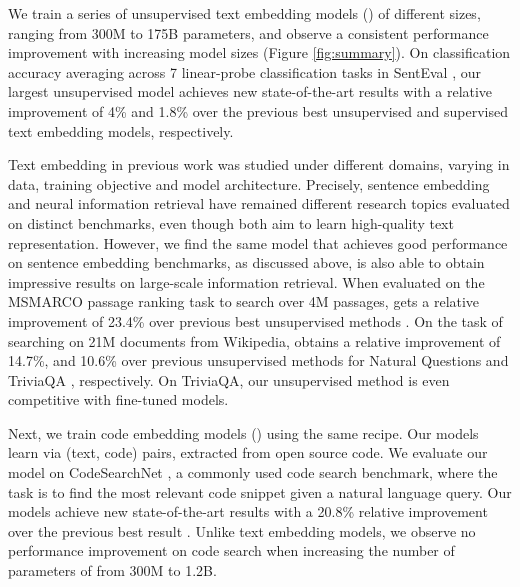 \documentclass[nohyperref]{article}
\begin{document}
We train a series of unsupervised text embedding models () of different sizes, ranging from 300M to 175B parameters, and observe a consistent performance improvement with increasing model sizes (Figure \ref{fig:summary}). On classification accuracy averaging across 7 linear-probe classification tasks in SentEval \cite{senteval}, our largest unsupervised model achieves new state-of-the-art results with a relative improvement of 4\% and 1.8\% over the previous best unsupervised \cite{declutr} and supervised \cite{simcse} text embedding models, respectively.

Text embedding in previous work was studied under different domains, varying in data, training objective and model architecture. Precisely, sentence embedding \cite{sbert,simcse,declutr} and neural information retrieval \cite{ORQA, REALM, dpr, e2e, contreiver} have remained different research topics evaluated on distinct benchmarks, even though both aim to learn high-quality text representation.
However, we find the same model that achieves good performance on sentence embedding benchmarks, as discussed above, is also able to obtain impressive results on large-scale information retrieval. When evaluated on the MSMARCO passage ranking task \cite{msmarco} to search over 4M passages,  gets a relative improvement of 23.4\% over previous best unsupervised methods \cite{bm25}.  On the task of searching on 21M documents from Wikipedia,  obtains a relative improvement of 14.7\%, and 10.6\% over previous unsupervised methods \cite{contreiver} for Natural Questions \cite{nq} and TriviaQA \cite{trivia}, respectively. On TriviaQA, our unsupervised method is even competitive with fine-tuned models. 

Next, we train code embedding models () using the same recipe. Our models learn via (text, code) pairs, extracted from open source code. We evaluate our model on CodeSearchNet \cite{codesearchnet}, a commonly used code search benchmark, where the task is to find the most relevant code snippet given a natural language query. Our models achieve new state-of-the-art results with a 20.8\% relative improvement over the previous best result \cite{Guo}. Unlike text embedding models, we observe no performance improvement on code search when increasing the number of parameters of  from 300M to 1.2B.
\end{document}
